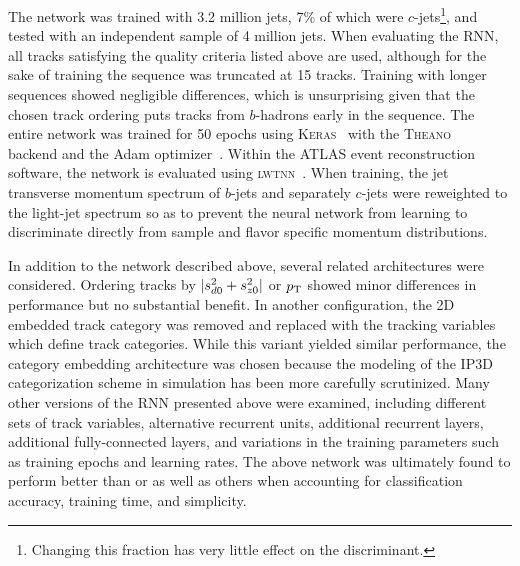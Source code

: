 The network was trained with 3.2 million jets, 7\% of which were $c$-jets\footnote{Changing this fraction has very little effect on the discriminant.}, and tested with an independent sample of 4 million jets. When evaluating the RNN, all tracks satisfying the quality criteria listed above are used, although for the sake of training the sequence was truncated at 15 tracks.
Training with longer sequences showed negligible differences, which is unsurprising given that the chosen track ordering puts tracks from $b$-hadrons early in the sequence. The entire network was trained for 50 epochs using \textsc{Keras}~\cite{keras} with the \textsc{Theano}~\cite{theano} backend and the Adam optimizer~\cite{ref:ADAM}. Within the ATLAS event reconstruction software, the network is evaluated using \textsc{lwtnn}~\cite{lwtnn}.
When training, the jet transverse momentum spectrum of $b$-jets and separately $c$-jets were reweighted to the light-jet spectrum so as to prevent the neural network from learning to discriminate directly from sample and flavor specific momentum distributions.


In addition to the network described above, several related architectures were considered.
Ordering tracks by $|s_{d0}^2 + s_{z0}^2|$ or $p_{{\rm T}}$ showed minor differences in performance but no substantial benefit.
In another configuration, the 2D embedded track category was removed and replaced with the tracking variables which define track categories.
While this variant yielded similar performance,
the category embedding architecture was chosen because
the modeling of the IP3D categorization scheme in simulation has been more carefully scrutinized.
Many other versions of the RNN presented above were examined, including different sets of track variables, alternative recurrent units, additional recurrent layers, additional fully-connected layers, and variations in the training parameters such as training epochs and learning rates.
The above network was ultimately found to perform better than or as well as others when accounting for classification accuracy, training time, and simplicity.


